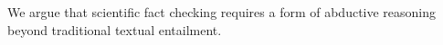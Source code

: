 


We argue that scientific fact checking requires a form of abductive reasoning beyond traditional textual entailment.

